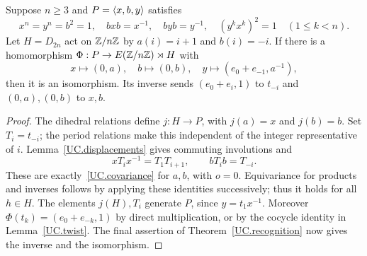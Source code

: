 \begin{corollary}\label{UC.cyclicrecognition}
Suppose $n\ge3$ and $P=\langle x,b,y\rangle$ satisfies
\[
 x^n=y^n=b^2=1,\quad bxb=x^{-1},\quad byb=y^{-1},
 \quad(y^kx^k)^2=1\quad(1\le k<n).
\]
Let $H=D_{2n}$ act on $\mathbb Z/n\mathbb Z$ by $a(i)=i+1$ and $b(i)=-i$.
If there is a homomorphism $\Phi:P\to E(\mathbb Z/n\mathbb Z)\rtimes H$ with
\[
 x\longmapsto(0,a),\quad b\longmapsto(0,b),\quad
 y\longmapsto(e_0+e_{-1},a^{-1}),
\]
then it is an isomorphism. Its inverse sends
$(e_0+e_i,1)$ to $t_{-i}$ and $(0,a),(0,b)$ to $x,b$.
\end{corollary}
\begin{proof}
The dihedral relations define $j:H\to P$, with $j(a)=x$ and
$j(b)=b$. Set $T_i=t_{-i}$; the period relations make this independent
of the integer representative of $i$. Lemma~\ref{UC.displacements}
gives commuting involutions and
\[
 xT_ix^{-1}=T_1T_{i+1},\qquad bT_ib=T_{-i}.
\]
These are exactly~\eqref{UC.covariance} for $a,b$, with $o=0$.
Equivariance for products and inverses follows by applying these
identities successively; thus it holds for all $h\in H$.
The elements $j(H),T_i$ generate $P$, since $y=t_1x^{-1}$.
Moreover $\Phi(t_k)=(e_0+e_{-k},1)$ by direct multiplication, or by
the cocycle identity in Lemma~\ref{UC.twist}. The final assertion of
Theorem~\ref{UC.recognition} now gives the inverse and the isomorphism.
\end{proof}
